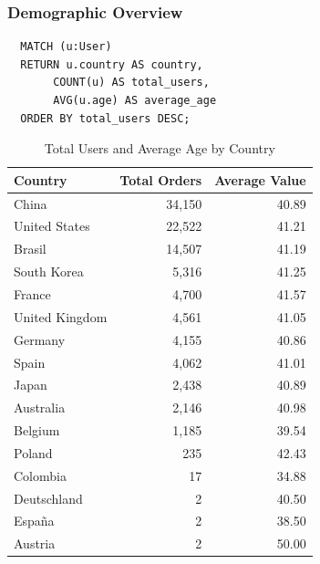 \documentclass[a4paper,12pt]{article}
\begin{document}
\subsubsection{Demographic Overview}
\begin{verbatim}
  MATCH (u:User)
  RETURN u.country AS country, 
       COUNT(u) AS total_users,
       AVG(u.age) AS average_age
  ORDER BY total_users DESC;
\end{verbatim}
\begin{table}[h!]
  \centering
  \caption{Total Users and Average Age by Country}
  \label{tab:Average_age}
  \begin{tabular}{l r r}
      \toprule
      \textbf{Country} & \textbf{Total Orders} & \textbf{Average Value} \\
      \midrule
      China           & 34,150  & 40.89 \\
      United States   & 22,522  & 41.21 \\
      Brasil          & 14,507  & 41.19 \\
      South Korea     & 5,316   & 41.25 \\
      France          & 4,700   & 41.57 \\
      United Kingdom  & 4,561   & 41.05 \\
      Germany         & 4,155   & 40.86 \\
      Spain           & 4,062   & 41.01 \\
      Japan           & 2,438   & 40.89 \\
      Australia       & 2,146   & 40.98 \\
      Belgium         & 1,185   & 39.54 \\
      Poland          & 235     & 42.43 \\
      Colombia        & 17      & 34.88 \\
      Deutschland     & 2       & 40.50 \\
      España          & 2       & 38.50 \\
      Austria         & 2       & 50.00 \\
      \bottomrule
  \end{tabular}
\end{table}
\end{document}
